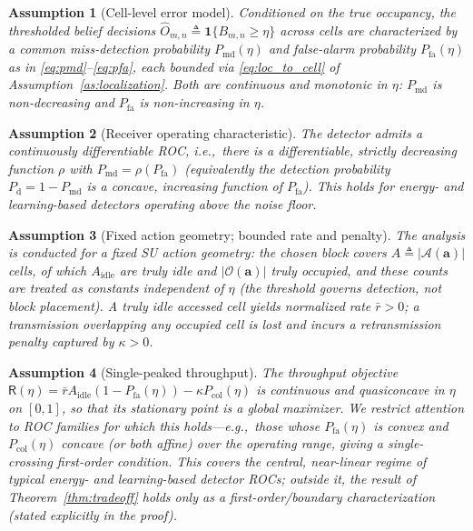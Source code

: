 \documentclass[journal]{IEEEtran}
\newtheorem{assumption}{Assumption}
\newcommand{\Ind}{\mathbf{1}}             %
\newcommand{\defeq}{\triangleq}
\newcommand{\occ}{O}                       %
\newcommand{\bel}{B}                       %
\newcommand{\Pmd}{P_{\mathrm{md}}}         %
\newcommand{\Pfa}{P_{\mathrm{fa}}}         %
\newcommand{\thr}{\eta}                    %
\newcommand{\act}{\bm{a}}                  %
\newcommand{\Pcol}{P_{\mathrm{col}}}       %
\newcommand{\thru}{\mathsf{R}}             %
\begin{document}
\begin{assumption}[Cell-level error model]
\label{as:cellerror}
Conditioned on the true occupancy, the thresholded belief decisions
$\hat{\occ}_{m,n}\defeq\Ind\{\bel_{m,n}\ge\thr\}$ across cells are
characterized by a common miss-detection probability $\Pmd(\thr)$ and
false-alarm probability $\Pfa(\thr)$ as in \eqref{eq:pmd}--\eqref{eq:pfa},
each bounded via \eqref{eq:loc_to_cell} of
Assumption~\ref{as:localization}. Both are continuous and monotonic in
$\thr$: $\Pmd$ is non-decreasing and $\Pfa$ is non-increasing in $\thr$.
\end{assumption}

\begin{assumption}[Receiver operating characteristic]
\label{as:roc}
The detector admits a continuously differentiable ROC, i.e.,\ there is a
differentiable, strictly decreasing function $\rho$ with
$\Pmd = \rho(\Pfa)$ (equivalently the detection probability
$P_{\mathrm{d}}=1-\Pmd$ is a concave, increasing function of $\Pfa$). This
holds for energy- and learning-based detectors operating above the
noise floor.
\end{assumption}

\begin{assumption}[Fixed action geometry; bounded rate and penalty]
\label{as:rate}
The analysis is conducted for a \emph{fixed} SU action geometry: the chosen
block covers $A\defeq|\mathcal{A}(\act)|$ cells, of which $A_{\mathrm{idle}}$
are truly idle and $|\mathcal{O}(\act)|$ truly occupied, and these counts are
treated as constants independent of $\thr$ (the threshold governs detection,
not block placement). A truly idle accessed cell yields normalized rate
$\bar r>0$; a transmission overlapping any occupied cell is lost and incurs a
retransmission penalty captured by $\kappa>0$.
\end{assumption}

\begin{assumption}[Single-peaked throughput]
\label{as:concave}
The throughput objective $\thru(\thr)=\bar r A_{\mathrm{idle}}(1-\Pfa(\thr))
-\kappa\Pcol(\thr)$ is continuous and \emph{quasiconcave} in $\thr$ on
$[0,1]$, so that its stationary point is a global maximizer. We restrict
attention to ROC families for which this holds---e.g.,\ those whose
$\Pfa(\thr)$ is convex and $\Pcol(\thr)$ concave (or both affine) over the
operating range, giving a single-crossing first-order condition. This covers
the central, near-linear regime of typical energy- and learning-based
detector ROCs; outside it, the result of Theorem~\ref{thm:tradeoff} holds
only as a first-order/boundary characterization (stated explicitly in the
proof).
\end{assumption}
\end{document}
